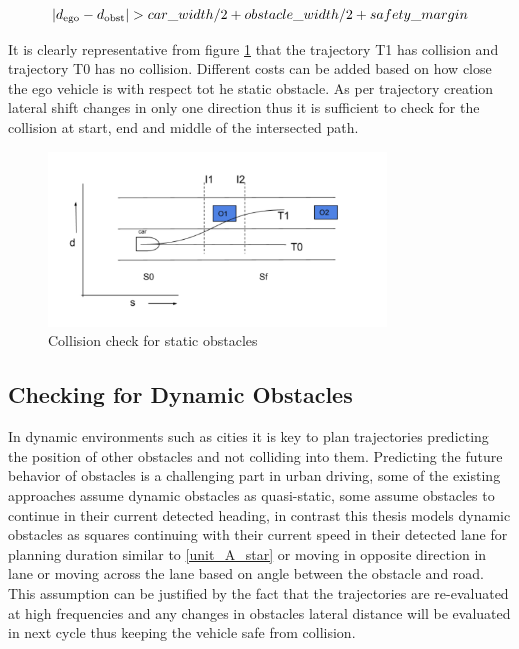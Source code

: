 \begin{equation}
    |d\textsubscript{ego} - d\textsubscript{obst}| > car\_width/2 + obstacle\_width/2 + safety\_margin
    \label{static_obst_safety_dist}
\end{equation}

It is clearly representative from figure \ref{static_check} that the trajectory T1 has collision and trajectory T0 has no collision. Different costs can be added based on how close the ego vehicle is with respect tot he static obstacle. As per trajectory creation lateral shift changes in only one direction thus it is sufficient to check for the collision at start, end and middle of the intersected path. 


 \begin{figure}[H]
    \centering
    \includegraphics[width=0.8\textwidth]{Images/static_check.png}
    \caption{Collision check for static obstacles}
    \label{static_check}
\end{figure}



\subsection{Checking for Dynamic Obstacles} \label{obstacle_check_dynamic}

In dynamic environments such as cities it is key to plan trajectories predicting the position of other obstacles and not colliding into them. Predicting the future behavior of obstacles
is a challenging part in urban driving, some of the existing approaches assume dynamic obstacles as quasi-static, some assume obstacles to continue in their current detected heading, in contrast this thesis models dynamic obstacles as squares continuing with their current speed in their detected lane for planning duration similar to \ref{unit_A_star} or moving in opposite direction in lane or moving across the lane based on angle between the obstacle and road. This assumption can be justified by the fact that the trajectories are re-evaluated at high frequencies and any changes in obstacles lateral distance will be evaluated in next cycle thus keeping the vehicle safe from collision. 

